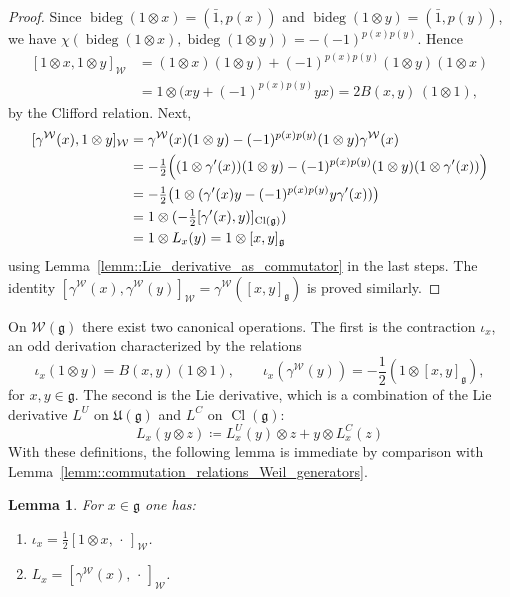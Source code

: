 \documentclass[11pt]{amsart}
\def\WW{{\mathcal{W}}}
\def\bideg{{\operatorname{bideg}}}
\def\Cl{{\operatorname{Cl}}}
\def\gg{{\mathfrak{g}}}
\theoremstyle{plain}
\newtheorem{lemma}[theorem]{Lemma}
\theoremstyle{remark}
\theoremstyle{definition}
\numberwithin{equation}{section}
\theoremstyle{remark}
\begin{document}
\begin{proof}
Since $\bideg(1\otimes x)=(\bar 1,p(x))$ and $\bideg(1\otimes y)=(\bar 1,p(y))$, we have
$\chi(\bideg(1\otimes x),\bideg(1\otimes y))=-(-1)^{p(x)p(y)}$. Hence
\[
\begin{split}
[1\otimes x,1\otimes y]_{\WW}
&=(1\otimes x)(1\otimes y)+(-1)^{p(x)p(y)}(1\otimes y)(1\otimes x)\\
&=1\otimes\bigl(xy+(-1)^{p(x)p(y)}yx\bigr)
=2B(x,y)\,(1\otimes 1),
\end{split}
\]
by the Clifford relation. Next,
\[
\begin{split}
[\gamma^{\WW}(x),1\otimes y]_{\WW}
&=\gamma^{\WW}(x)(1\otimes y)-(-1)^{p(x)p(y)}(1\otimes y)\gamma^{\WW}(x)\\
&=-\tfrac12\Bigl((1\otimes \gamma'(x))(1\otimes y)-(-1)^{p(x)p(y)}(1\otimes y)(1\otimes \gamma'(x))\Bigr)
\\ &=-\tfrac12\bigl(1\otimes(\gamma'(x)y-(-1)^{p(x)p(y)} y\gamma'(x))\bigr)\\
&=1\otimes (-\tfrac{1}{2}[\gamma'(x),y)]_{\Cl(\gg)}) \\ &=1\otimes L_{x}(y)=1\otimes [x,y]_{\gg}
\end{split}
\]
using Lemma~\ref{lemm::Lie_derivative_as_commutator} in the last steps. The identity
$[\gamma^{\WW}(x),\gamma^{\WW}(y)]_{\WW}=\gamma^{\WW}([x,y]_{\gg})$ is proved similarly.
\end{proof}

On $\mathcal{W}(\gg)$ there exist two canonical operations. The first is the contraction $\iota_{x}$, an odd derivation characterized by the relations 
\begin{equation} \label{eq::contraction_Weil}
\iota_{x}(1\otimes y)=B(x,y)(1\otimes 1), \qquad \iota_{x}(\gamma^{\WW}(y))=-\frac{1}{2}(1\otimes [x,y]_{\gg}),
\end{equation}
for $x,y \in \gg$. The second is the Lie derivative, which is a combination of the Lie derivative $L^{U}$ on $\mathfrak{U}(\gg)$ and $L^{C}$ on $\Cl(\gg)$:
\begin{equation} \label{eq::Lie_derivative_Weil}
L_{x}(y \otimes z)\coloneqq L_{x}^{U}(y) \otimes z + y \otimes L_{x}^{C}(z)
\end{equation}
With these definitions, the following lemma is immediate by comparison with Lemma~\ref{lemm::commutation_relations_Weil_generators}.

\begin{lemma} \label{lemm::contraction_and_Lie_derivative_in_Weil}
For $x\in\gg$ one has:
\begin{enumerate}
\item[a)] $\iota_{x}=\tfrac12[1\otimes x,\,\cdot\,]_{\WW}$.
\item[b)] $L_{x}=[\gamma^{\WW}(x),\,\cdot\,]_{\WW}$.
\end{enumerate}
\end{lemma}
\end{document}
